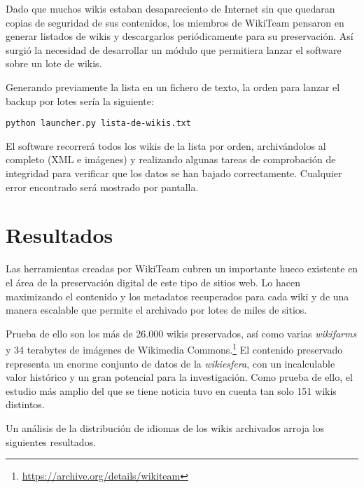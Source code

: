 \documentclass[14pt,twocolumn]{article}
\begin{document}
Dado que muchos wikis estaban desapareciento de Internet sin que quedaran copias de seguridad de sus contenidos, los miembros de WikiTeam pensaron en generar listados de wikis y descargarlos periódicamente para su preservación. Así surgió la necesidad de desarrollar un módulo que permitiera lanzar el software sobre un lote de wikis.

Generando previamente la lista en un fichero de texto, la orden para lanzar el backup por lotes sería la siguiente:

{\tt python launcher.py lista-de-wikis.txt}

El software recorrerá todos los wikis de la lista por orden, archivándolos al completo (XML e imágenes) y realizando algunas tareas de comprobación de integridad para verificar que los datos se han bajado correctamente. Cualquier error encontrado será mostrado por pantalla.

\section{Resultados}

Las herramientas creadas por WikiTeam cubren un importante hueco existente en el área de la preservación digital de este tipo de sitios web. Lo hacen maximizando el contenido y los metadatos recuperados para cada wiki y de una manera escalable que permite el archivado por lotes de miles de sitios.

Prueba de ello son los más de 26.000 wikis preservados, así como varias \textit{wikifarms} y 34 terabytes de imágenes de Wikimedia Commons.\footnote{\href{https://archive.org/details/wikiteam}{https://archive.org/details/wikiteam}} El contenido preservado representa un enorme conjunto de datos de la \textit{wikiesfera}, con un incalculable valor histórico y un gran potencial para la investigación. Como prueba de ello, el estudio más amplio del que se tiene noticia tuvo en cuenta tan solo 151 wikis distintos.\cite{stuckman2009}

Un análisis de la distribución de idiomas de los wikis archivados arroja los siguientes resultados.
\end{document}
